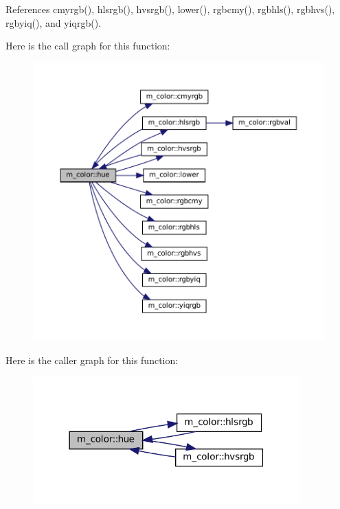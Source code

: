 References cmyrgb(), hlsrgb(), hvsrgb(), lower(), rgbcmy(), rgbhls(), rgbhvs(), rgbyiq(), and yiqrgb().

Here is the call graph for this function\+:\nopagebreak
\begin{figure}[H]
\begin{center}
\leavevmode
\includegraphics[width=350pt]{namespacem__color_a56dd07bbf1378ccc78a230d171f9d429_cgraph}
\end{center}
\end{figure}
Here is the caller graph for this function\+:\nopagebreak
\begin{figure}[H]
\begin{center}
\leavevmode
\includegraphics[width=291pt]{namespacem__color_a56dd07bbf1378ccc78a230d171f9d429_icgraph}
\end{center}
\end{figure}
\mbox{\label{namespacem__color_a334ec90d94bbfb9a4c08c5f9efdb8c47}} 

